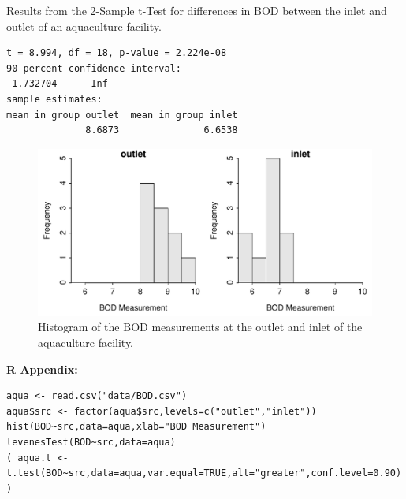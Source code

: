 \documentclass[10pt,openany]{book}\usepackage[]{graphicx}\usepackage[]{color}
\makeatletter
\newenvironment{kframe}{%
 \def\at@end@of@kframe{}%
 \ifinner\ifhmode%
  \def\at@end@of@kframe{\end{minipage}}%
  \begin{minipage}{\columnwidth}%
 \fi\fi%
 \def\FrameCommand##1{\hskip\@totalleftmargin \hskip-\fboxsep
 \colorbox{shadecolor}{##1}\hskip-\fboxsep
     \hskip-\linewidth \hskip-\@totalleftmargin \hskip\columnwidth}%
 \MakeFramed {\advance\hsize-\width
   \@totalleftmargin\z@ \linewidth\hsize
   \@setminipage}}%
 {\par\unskip\endMakeFramed%
 \at@end@of@kframe}
\newenvironment{knitrout}{}{} %
\makeatother
\begin{document}
\begin{table}[h]
  \caption{Results from the 2-Sample t-Test for differences in BOD between the inlet and outlet of an aquaculture facility.}
  \label{tab:2tBOD}
\vspace*{-8pt}
\begin{knitrout}
\color{fgcolor}\begin{kframe}
\begin{verbatim}
t = 8.994, df = 18, p-value = 2.224e-08
90 percent confidence interval:
 1.732704      Inf 
sample estimates:
mean in group outlet  mean in group inlet 
              8.6873               6.6538 
\end{verbatim}
\end{kframe}
\end{knitrout}
\end{table}

\begin{knitrout}
\color{fgcolor}\begin{figure}[hbtp]

{\centering \includegraphics[width=.7\linewidth]{Figs/AquaHist-1} 

}

\caption[Histogram of the BOD measurements at the outlet and inlet of the aquaculture facility]{Histogram of the BOD measurements at the outlet and inlet of the aquaculture facility.}\label{fig:AquaHist}
\end{figure}


\end{knitrout}

\begin{minipage}{\textwidth}
\textbf{R Appendix:}
\begin{knitrout}
\color{fgcolor}\begin{kframe}
\begin{verbatim}
aqua <- read.csv("data/BOD.csv")
aqua$src <- factor(aqua$src,levels=c("outlet","inlet"))
hist(BOD~src,data=aqua,xlab="BOD Measurement")
levenesTest(BOD~src,data=aqua)
( aqua.t <- t.test(BOD~src,data=aqua,var.equal=TRUE,alt="greater",conf.level=0.90) )
\end{verbatim}
\end{kframe}
\end{knitrout}
\end{minipage}
\end{document}
